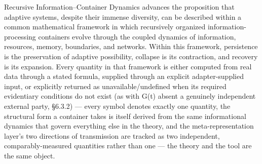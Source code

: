 \documentclass[
]{article}
\begin{document}
Recursive Information--Container Dynamics advances the proposition that
adaptive systems, despite their immense diversity, can be described
within a common mathematical framework in which recursively organized
information-processing containers evolve through the coupled dynamics of
information, resources, memory, boundaries, and networks. Within this
framework, persistence is the preservation of adaptive possibility,
collapse is its contraction, and recovery is its expansion. Every
quantity in that framework is either computed from real data through a
stated formula, supplied through an explicit adapter-supplied input, or
explicitly returned as unavailable/undefined when its required
evidentiary conditions do not exist (as with G(t) absent a genuinely
independent external party, §6.3.2) --- every symbol denotes exactly one
quantity, the structural form a container takes is itself derived from
the same informational dynamics that govern everything else in the
theory, and the meta-representation layer's two directions of
transmission are tracked as two independent, comparably-measured
quantities rather than one --- the theory and the tool are the same
object.
\end{document}
